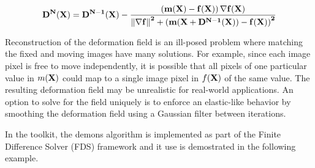 \begin{equation}
\bf{D}^{N}(\bf{X}) = \bf{D}^{N-1}(\bf{X}) - \frac
{\left(  m(\bf{X}) - f(\bf{X}) \right) \nabla f(\bf{X})}
{\left\|  \nabla f \right\|^2 + \left(  
m(\bf{X}+ \bf{D}^{N-1}(\bf{X}) )
 - f(\bf{X}) \right)^2 } 
\label{eqn:DemonsUpdateEquation}
\end{equation}

Reconstruction of the deformation field is an ill-posed problem where matching the
fixed and moving images have many solutions. For example, since each image pixel
is free to move independently, it is possible that all pixels of one particular
value in $m(\bf{X})$ could map to a single image pixel in $f(\bf{X})$
of the same value. The resulting deformation field may be unrealistic for real-world
applications. An option to solve for the field uniquely is to enforce an 
elastic-like behavior by smoothing the deformation field using a Gaussian filter 
between iterations.

In the toolkit, the demons algorithm is implemented as part of the Finite Difference
Solver (FDS) framework and it use is demostrated in the following example.

 

